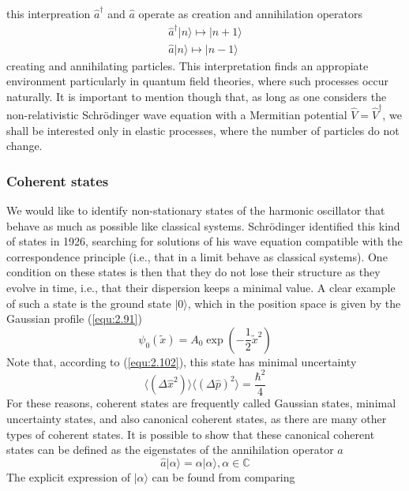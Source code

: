 this interpreation $\hat{a}^{\dagger}$ and $\hat{a}$ operate
as creation and annihilation operators
\begin{align}
  \hat{a}^{\dagger} \vert n\rangle  \mapsto \vert n+1\rangle  \nonumber\\
  \hat{a} \vert n\rangle  \mapsto \vert n-1\rangle  \nonumber
\end{align}
creating and annihilating particles. This interpretation
finds an appropiate environment particularly in quantum
field theories, where such processes
occur naturally. It is important to mention though that, as
long as one considers the non-relativistic Schrödinger wave
equation with a Mermitian potential $\hat{V} =
\hat{V}^{\dagger}$, we shall be interested only in elastic
processes, where the number of particles do not change.
\subsubsection{Coherent states}
We would like to identify non-stationary states of the
harmonic oscillator that behave as much as possible like
classical systems. Schrödinger identified this kind of
states in 1926, searching for solutions of his wave equation
compatible with the correspondence principle (i.e., that in
a limit behave as classical systems). One condition on these
states is then that they do not lose their structure as they
evolve in time, i.e., that their dispersion keeps a minimal
value. A clear example of such a state is the ground state
$\vert 0\rangle $, which in the position space is given by the Gaussian
profile (\ref{equ:2.91})
$$
 \psi_0 (\tilde{x}) = A_0 \exp(-\frac{1}{2}\tilde{x}^2)
$$
Note that, according to (\ref{equ:2.102}), this state has
minimal uncertainty
$$
\langle (\Delta \hat{x}^2)\rangle \langle (\Delta \hat{p})^2\rangle  = \frac{\hbar^2}{4}
$$
For these reasons, coherent states are frequently called
Gaussian states, minimal uncertainty states, and also
canonical coherent states, as there are many other types of
coherent states.
It is possible to show that these canonical coherent states
can be defined as the eigenstates of the annihilation
operator $\hat{a}$
\begin{equation}
  \hat{a}\vert \alpha\rangle  = \alpha\vert \alpha\rangle , \alpha \in \mathbb{C}
  \label{equ:2.106}
\end{equation}
The explicit expression of $\vert \alpha\rangle $ can be found from
comparing

